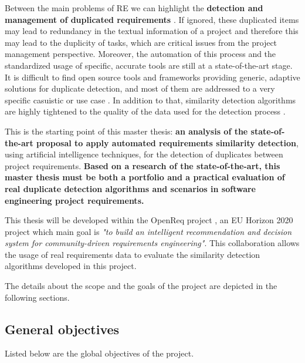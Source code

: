 \documentclass[11pt]{article}
\begin{document}
Between the main problems of RE we can highlight the \textbf{detection and management of duplicated requirements} \cite{b4}. If ignored, these duplicated items may lead to redundancy in the textual information of a project and therefore this may lead to the duplicity of tasks, which are critical issues from the project management perspective. Moreover, the automation of this process and the standardized usage of specific, accurate tools are still at a state-of-the-art stage. It is difficult to find open source tools and frameworks providing generic, adaptive solutions for duplicate detection, and most of them are addressed to a very specific casuistic or use case \cite{b5}. In addition to that, similarity detection algorithms are highly tightened to the quality of the data used for the detection process \cite{b6}.

This is the starting point of this master thesis: \textbf{an analysis of the state-of-the-art proposal to apply automated requirements similarity detection}, using artificial intelligence techniques, for the detection of duplicates between project requirements. \textbf{Based on a research of the state-of-the-art, this master thesis must be both a portfolio and a practical evaluation of real duplicate detection algorithms and scenarios in software engineering project requirements. } 

This thesis will be developed within the OpenReq project \cite{b7}, an EU Horizon 2020 project which main goal is \textit{"to build an intelligent recommendation and decision system for community-driven require­ments engineering"}. This collaboration allows the usage of real requirements data to evaluate the similarity detection algorithms developed in this project.

The details about the scope and the goals of the project are depicted in the following sections.

\subsection{General objectives}
\label{sec:main_objectives}

Listed below are the global objectives of the project.
\end{document}
